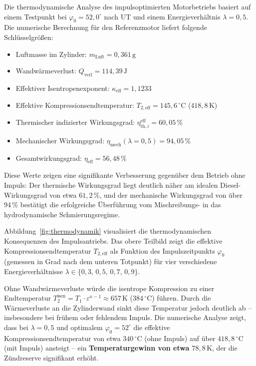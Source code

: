 ﻿\documentclass[a4paper,12pt]{article}
\begin{document}
Die thermodynamische Analyse des impulsoptimierten Motorbetriebs basiert auf
einem Testpunkt bei $\varphi_0 = 52{,}0^\circ$ nach UT und einem Energieverhältnis
$\lambda = 0{,}5$. Die numerische Berechnung für den Referenzmotor liefert
folgende Schlüsselgrößen:

\begin{itemize}
  \item Luftmasse im Zylinder: $m_\text{Luft} = 0{,}361\,\text{g}$
  \item Wandwärmeverlust: $Q_\text{verl} = 114{,}39\,\text{J}$
  \item Effektiver Isentropenexponent: $\kappa_\text{eff} = 1{,}1233$
  \item Effektive Kompressionsendtemperatur: $T_{2,\text{eff}} = 145{,}6\,^\circ\text{C}$ ($418{,}8\,\text{K}$)
  \item Thermischer indizierter Wirkungsgrad: $\eta_{\text{th},i}^\text{eff} = 60{,}05\,\%$
  \item Mechanischer Wirkungsgrad: $\eta_\text{mech}(\lambda=0{,}5) = 94{,}05\,\%$
  \item Gesamtwirkungsgrad: $\eta_\text{eff} = 56{,}48\,\%$
\end{itemize}

Diese Werte zeigen eine signifikante Verbesserung gegenüber dem Betrieb
ohne Impuls: Der thermische Wirkungsgrad liegt deutlich näher am idealen
Diesel-Wirkungsgrad von etwa $61{,}2\,\%$, und der mechanische Wirkungsgrad
von über $94\,\%$ bestätigt die erfolgreiche Überführung vom Mischreibungs-
in das hydrodynamische Schmierungsregime.

Abbildung~\ref{fig:thermodynamik} visualisiert die thermodynamischen
Konsequenzen des Impulsantriebs. Das obere Teilbild zeigt die effektive
Kompressionsendtemperatur $T_{2,\text{eff}}$ als Funktion des Impulszeitpunkts
$\varphi_0$ (gemessen in Grad nach dem unteren Totpunkt) für vier verschiedene
Energieverhältnisse $\lambda \in \{0{,}3,\, 0{,}5,\, 0{,}7,\, 0{,}9\}$.

Ohne Wandwärmeverluste würde die isentrope Kompression zu einer
Endtemperatur $T_2^\text{isen} = T_1 \cdot \varepsilon^{\kappa-1} \approx
657\,\text{K}$ ($384\,^\circ\text{C}$) führen. Durch die Wärmeverluste
an die Zylinderwand sinkt diese Temperatur jedoch deutlich ab -- insbesondere
bei frühem oder fehlendem Impuls. Die numerische Analyse zeigt, dass
bei $\lambda = 0{,}5$ und optimalem $\varphi_0 = 52^\circ$ die effektive
Kompressionsendtemperatur von etwa $340\,^\circ\text{C}$ (ohne Impuls)
auf über $418{,}8\,^\circ\text{C}$ (mit Impuls) ansteigt -- ein
\textbf{Temperaturgewinn von etwa $78{,}8\,\text{K}$}, der die Zündreserve
signifikant erhöht.
\end{document}
